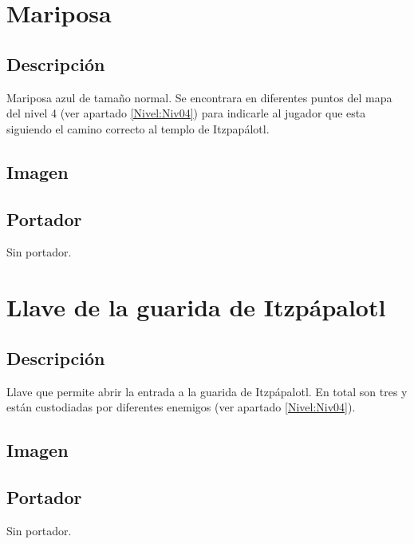 	\section{Mariposa} \label{item:Mariposa}
		\subsection{Descripción}
		Mariposa azul de tamaño normal. Se encontrara en diferentes puntos del mapa del nivel 4 (ver apartado \ref{Nivel:Niv04})  para indicarle al jugador que esta siguiendo el camino correcto al templo de Itzpapálotl.
		\subsection{Imagen}
	\subsection{Portador}
	Sin portador. 
	
\section{Llave de la guarida de Itzpápalotl} \label{item:LlaveItz}
		\subsection{Descripción}
		
Llave que permite abrir la entrada a la guarida de Itzpápalotl. En total son tres y están custodiadas por diferentes enemigos (ver apartado \ref{Nivel:Niv04}).
		\subsection{Imagen}
	\subsection{Portador}
	Sin portador. 